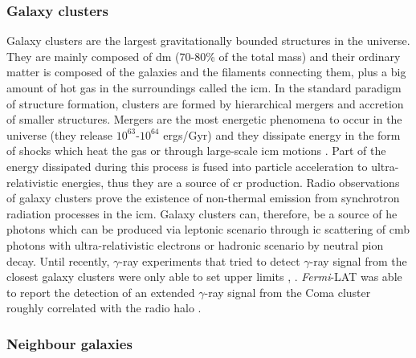 \documentclass[main.tex]{subfiles}
\begin{document}
\subsubsection{Galaxy clusters} \label{sec:clusters}

Galaxy clusters are the largest gravitationally bounded structures in the universe. They are mainly composed of \gls{dm} (70-80\% of the total mass) and their ordinary matter is composed of the galaxies and the filaments connecting them, plus a big amount of hot gas in the surroundings called the \gls{icm}\cite{2017galaxyclusters}. In the standard paradigm of structure formation, clusters are formed by hierarchical mergers and accretion of smaller structures. Mergers are the most energetic phenomena to occur in the universe (they release $10^{63}$-$10^{64}$ ergs/Gyr) and they dissipate energy in the form of shocks which heat the gas or through large-scale \gls{icm} motions \cite{2014CRinClusters}. Part of the energy dissipated during this process is fused into particle acceleration to ultra-relativistic energies, thus they are a source of \gls{cr} production. Radio observations of galaxy clusters prove the existence of non-thermal emission from synchrotron radiation processes in the \gls{icm}. Galaxy clusters can, therefore, be a source of \gls{he} photons which can be produced via leptonic scenario through \gls{ic} scattering of \gls{cmb} photons with ultra-relativistic electrons or hadronic scenario by neutral pion decay.
Until recently, $\gamma$-ray experiments that tried to detect $\gamma$-ray signal from the closest galaxy clusters were only able to set upper limits \cite{2010LimitsClustersFermi}, \cite{2012LimitsClustersMagic}. \textit{Fermi}-LAT was able to report the detection of an extended $\gamma$-ray signal from the Coma cluster roughly correlated with the radio halo \cite{2018ComaCluster}.

\subsubsection{Neighbour galaxies}
\end{document}
